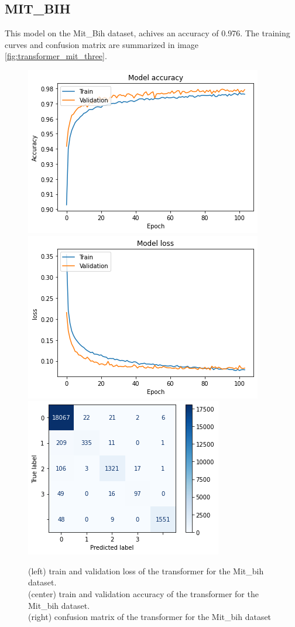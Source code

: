 \documentclass[11pt]{scrartcl}
\begin{document}
\subsection{MIT\_BIH}
This model on the Mit\_Bih dataset, achives an accuracy of 0.976. The training curves and confusion matrix are summarized in image \ref{fig:transformer_mit_three}.
\begin{figure}[htp]
\centering
\includegraphics[width=.30\textwidth]{../models_performance_graphs/mit/transformer_mit_accuracy.png}\hfill
\includegraphics[width=.30\textwidth]{../models_performance_graphs/mit/transformer_mit_loss.png}\hfill
\includegraphics[width=.30\textwidth]{../models_performance_graphs/mit/transformer_mit_confusion.png}
\caption{(left) train and validation loss of the transformer for the Mit\_bih dataset. \\ (center) train and validation accuracy of the transformer for the Mit\_bih dataset. \\(right) confusion matrix of the transformer for the Mit\_bih dataset}
\label{fig:res_mit_three}
\end{figure}

\end{document}
